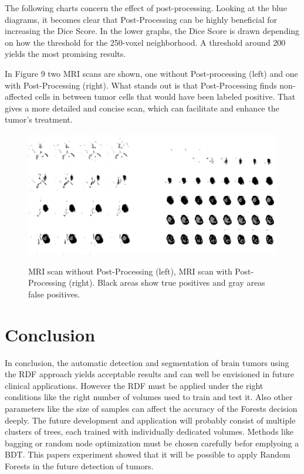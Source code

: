\documentclass[
12pt,
headsepline,
bibliography=totoc,
twoside=semi,
fleqn
]{scrartcl}
\begin{document}
 The following charts concern the effect of post-processing. Looking at the blue diagrams, it becomes clear that Post-Processing can be highly beneficial for increasing the Dice Score. In the lower graphs, the Dice Score is drawn depending on how the threshold for the 250-voxel neighborhood. A threshold around 200 yields the most promising results. 

 In Figure 9 two MRI scans are shown, one without Post-processing (left) and one with Post-Processing (right). What stands out is that Post-Processing finds non-affected cells in between tumor cells that would have been labeled positive. That gives a more detailed and concise scan, which can facilitate and enhance the tumor's treatment. 

 \begin{figure}[h]
 \centering \includegraphics[scale=0.5]{BDT19.png}\label{fig:fig19}
 \caption{MRI scan without Post-Processing (left), MRI scan with Post-Processing (right). Black areas show true positives and gray areas false positives.}
 \end{figure} 

\section{Conclusion\label{sec:sec5}}
  In conclusion, the automatic detection and segmentation of brain tumors using the RDF approach yields acceptable results and can well be envisioned in future clinical applications. However the RDF must be applied under the right conditions like the right number of volumes used to train and test it. Also other parameters like the size of samples can affect the accuracy of the Forests decision deeply. The future development and application will probably consist of multiple clusters of trees, each trained with individually dedicated volumes. Methods like bagging or random node optimization must be chosen carefully befor emplyoing a BDT. This papers experiment showed that it will be possible to apply Random Forests in the future detection of tumors. 
\end{document}
